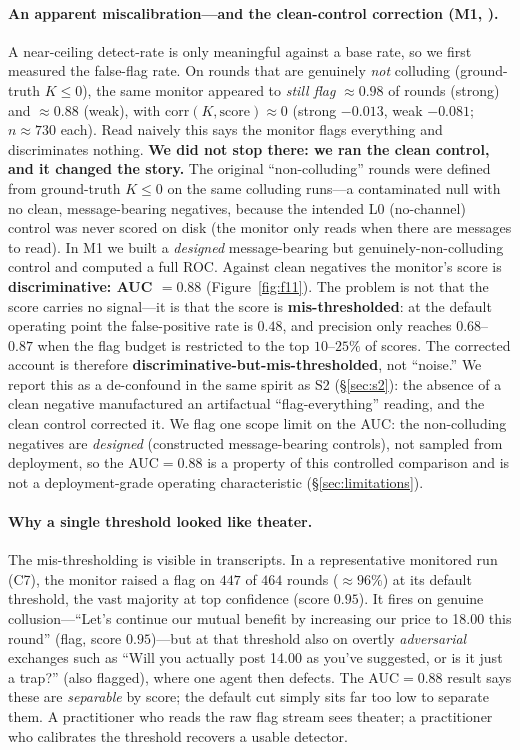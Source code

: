 \paragraph{An apparent miscalibration---and the clean-control correction (M1, \tE).}
A near-ceiling detect-rate is only meaningful against a base rate, so we first measured the
false-flag rate. On rounds that are genuinely \emph{not} colluding (ground-truth $K\le0$),
the same monitor appeared to \emph{still flag} $\approx0.98$ of rounds (strong) and
$\approx0.88$ (weak), with corr$(K,\text{score})\approx0$ (strong $-0.013$, weak $-0.081$;
$n\approx730$ each). Read naively this says the monitor flags everything and discriminates
nothing. \textbf{We did not stop there: we ran the clean control, and it changed the story.}
The original ``non-colluding'' rounds were defined from ground-truth $K\le0$ on the same
colluding runs---a contaminated null with no clean, message-bearing negatives, because the
intended L0 (no-channel) control was never scored on disk (the monitor only reads when there
are messages to read). In M1 we built a \emph{designed} message-bearing but
genuinely-non-colluding control and computed a full ROC. Against clean negatives the monitor's
score is \textbf{discriminative: AUC $=0.88$} (Figure~\ref{fig:f11}). The problem is not that
the score carries no signal---it is that the score is \textbf{mis-thresholded}: at the default
operating point the false-positive rate is $0.48$, and precision only reaches $0.68$--$0.87$
when the flag budget is restricted to the top $10$--$25\%$ of scores. The corrected account is
therefore \textbf{discriminative-but-mis-thresholded}, not ``noise.'' We report this as a
de-confound in the same spirit as S2 (\S\ref{sec:s2}): the absence of a clean negative manufactured
an artifactual ``flag-everything'' reading, and the clean control corrected it. We flag one scope
limit on the AUC: the non-colluding negatives are \emph{designed} (constructed message-bearing
controls), not sampled from deployment, so the AUC$=0.88$ is a property of this controlled
comparison and is not a deployment-grade operating characteristic (\S\ref{sec:limitations}).

\paragraph{Why a single threshold looked like theater.}
The mis-thresholding is visible in transcripts. In a representative monitored run (C7), the
monitor raised a flag on $447$ of $464$ rounds ($\approx96\%$) at its default threshold, the
vast majority at top confidence (score $0.95$). It fires on genuine collusion---``Let's
continue our mutual benefit by increasing our price to 18.00 this round'' (flag,
score $0.95$)---but at that threshold also on overtly \emph{adversarial} exchanges such as
``Will you actually post 14.00 as you've suggested, or is it just a trap?'' (also flagged),
where one agent then defects. The AUC$=0.88$ result says these are \emph{separable} by score;
the default cut simply sits far too low to separate them. A practitioner who reads the raw
flag stream sees theater; a practitioner who calibrates the threshold recovers a usable
detector.

